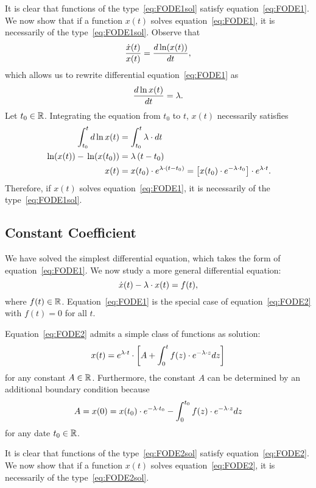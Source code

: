 \documentclass[letterpaper,12pt,leqno]{article}
\begin{document}
It is clear that functions of the type~\eqref{eq:FODE1sol} satisfy equation~\eqref{eq:FODE1}. We now show that if a function $x(t)$ solves equation~\eqref{eq:FODE1}, it is necessarily of the type~\eqref{eq:FODE1sol}.
Observe that
\begin{equation*}
\frac{\dot{x}(t)}{x(t)}=\od{\ln{x(t)}}{t},
\end{equation*}
which allows us to rewrite differential equation~\eqref{eq:FODE1} as 
\begin{equation*}
\frac{d\ln x(t)}{dt}=\l.
\end{equation*}
Let $t_{0}\in\mathbb{R}$. Integrating the equation from $t_{0}$ to $t$, $x(t)$ necessarily satisfies
\begin{align*}
\int_{t_{0}}^{t} d\ln x(t)&=\int_{t_{0}}^{t} \l\cdot dt\\
\ln{x(t)} -\ln{x(t_{0})}& =\l \bp{t-t_{0}}\\
x(t)&=x(t_{0})\cdot  e^{\l \cdot(t-t_{0})}=\bs{x(t_{0})\cdot e^{-\l \cdot t_{0}}}\cdot e^{\l \cdot t}.
\end{align*}
Therefore, if $x(t)$ solves equation~\eqref{eq:FODE1}, it is necessarily of the type~\eqref{eq:FODE1sol}.

\subsection{Constant Coefficient}

We have solved the simplest differential equation, which takes the form of equation~\eqref{eq:FODE1}. We now study a more general differential equation: 
\begin{equation}
\dot{x}(t)-\lambda \cdot x(t) =f(t),\label{eq:FODE2}
\end{equation}
where $f(t)\in \mathbb{R}$. Equation~\eqref{eq:FODE1} is the special case of equation~\eqref{eq:FODE2} with $f(t)=0$ for all $t$.

Equation~\eqref{eq:FODE2} admits a simple class of functions as solution:
\begin{equation}
x(t)=e^{\lambda \cdot t} \cdot \left[ A+\int_{0}^{t}f(z) \cdot e^{-\lambda \cdot z} dz \right] \label{eq:FODE2sol}
\end{equation}
for any constant $A\in \mathbb{R}$. Furthermore, the constant $A$ can be determined by an additional boundary condition because
\[A=x(0)=x(t_{0})\cdot e^{-\lambda \cdot t_{0}}-\int_{0}^{t_{0}}f(z) \cdot e^{-\lambda \cdot z} dz\]
for any date $t_{0}\in \mathbb{R}$.

It is clear that functions of the type~\eqref{eq:FODE2sol} satisfy equation~\eqref{eq:FODE2}. We now show that if a function $x(t)$ solves equation~\eqref{eq:FODE2}, it is necessarily of the type~\eqref{eq:FODE2sol}.
\end{document}
